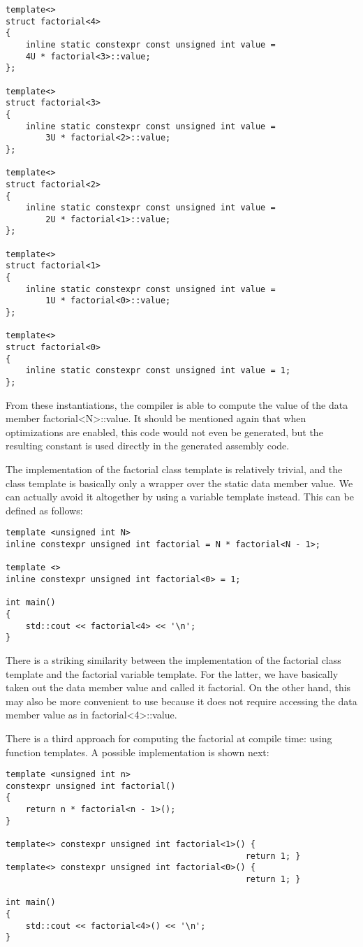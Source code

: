 \begin{lstlisting}[style=styleCXX]
template<>
struct factorial<4>
{
	inline static constexpr const unsigned int value =
	4U * factorial<3>::value;
};

template<>
struct factorial<3>
{
	inline static constexpr const unsigned int value =
		3U * factorial<2>::value;
};

template<>
struct factorial<2>
{
	inline static constexpr const unsigned int value =
		2U * factorial<1>::value;
};

template<>
struct factorial<1>
{
	inline static constexpr const unsigned int value =
		1U * factorial<0>::value;
};

template<>
struct factorial<0>
{
	inline static constexpr const unsigned int value = 1;
};
\end{lstlisting}

From these instantiations, the compiler is able to compute the value of the data member factorial<N>::value. It should be mentioned again that when optimizations are enabled, this code would not even be generated, but the resulting constant is used directly in the generated assembly code.

The implementation of the factorial class template is relatively trivial, and the class template is basically only a wrapper over the static data member value. We can actually avoid it altogether by using a variable template instead. This can be defined as follows:

\begin{lstlisting}[style=styleCXX]
template <unsigned int N>
inline constexpr unsigned int factorial = N * factorial<N - 1>;

template <>
inline constexpr unsigned int factorial<0> = 1;

int main()
{
	std::cout << factorial<4> << '\n';
}
\end{lstlisting}

There is a striking similarity between the implementation of the factorial class template and the factorial variable template. For the latter, we have basically taken out the data member value and called it factorial. On the other hand, this may also be more convenient to use because it does not require accessing the data member value as in factorial<4>::value.

There is a third approach for computing the factorial at compile time: using function templates. A possible implementation is shown next:

\begin{lstlisting}[style=styleCXX]
template <unsigned int n>
constexpr unsigned int factorial()
{
	return n * factorial<n - 1>();
}

template<> constexpr unsigned int factorial<1>() {
												return 1; }
template<> constexpr unsigned int factorial<0>() {
												return 1; }

int main()
{
	std::cout << factorial<4>() << '\n';
}
\end{lstlisting}

